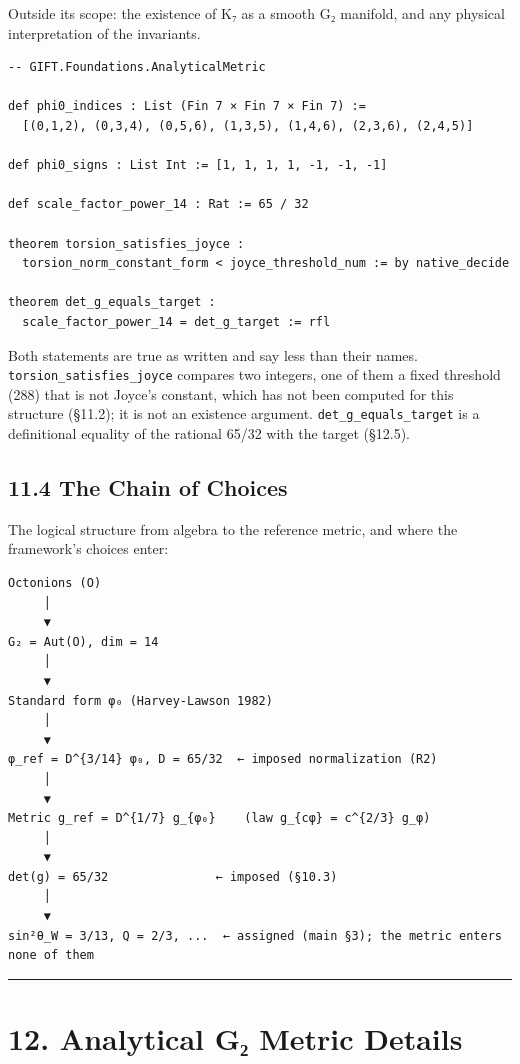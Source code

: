 \documentclass[11pt,a4paper]{article}
\begin{document}
Outside its scope: the existence of K₇ as a smooth G₂ manifold, and any physical interpretation of the invariants.

\begin{verbatim}
-- GIFT.Foundations.AnalyticalMetric

def phi0_indices : List (Fin 7 × Fin 7 × Fin 7) :=
  [(0,1,2), (0,3,4), (0,5,6), (1,3,5), (1,4,6), (2,3,6), (2,4,5)]

def phi0_signs : List Int := [1, 1, 1, 1, -1, -1, -1]

def scale_factor_power_14 : Rat := 65 / 32

theorem torsion_satisfies_joyce :
  torsion_norm_constant_form < joyce_threshold_num := by native_decide

theorem det_g_equals_target :
  scale_factor_power_14 = det_g_target := rfl
\end{verbatim}

Both statements are true as written and say less than their names. \texttt{torsion\_\allowbreak{}satisfies\_\allowbreak{}joyce} compares two integers, one of them a fixed threshold (288) that is not Joyce's constant, which has not been computed for this structure (§11.2); it is not an existence argument. \texttt{det\_\allowbreak{}g\_\allowbreak{}equals\_\allowbreak{}target} is a definitional equality of the rational 65/32 with the target (§12.5).

\subsection{11.4 The Chain of Choices}\label{the-chain-of-choices}

The logical structure from algebra to the reference metric, and where the framework's choices enter:

\begin{verbatim}
Octonions (O)
     │
     ▼
G₂ = Aut(O), dim = 14
     │
     ▼
Standard form φ₀ (Harvey-Lawson 1982)
     │
     ▼
φ_ref = D^{3/14} φ₀, D = 65/32  ← imposed normalization (R2)
     │
     ▼
Metric g_ref = D^{1/7} g_{φ₀}    (law g_{cφ} = c^{2/3} g_φ)
     │
     ▼
det(g) = 65/32               ← imposed (§10.3)
     │
     ▼
sin²θ_W = 3/13, Q = 2/3, ...  ← assigned (main §3); the metric enters none of them
\end{verbatim}

\begin{center}\rule{\linewidth}{0.5pt}\end{center}

\section{12. Analytical G₂ Metric Details}\label{analytical-gux2082-metric-details}
\end{document}

